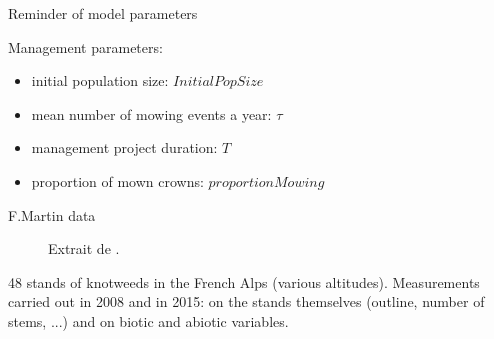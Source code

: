 \documentclass{myBeamer}
\begin{document}
\begin{frame}{Reminder of model parameters}
\bigbreak

Management parameters:
\begin{itemize}
\item initial population size: $ InitialPopSize $
\item mean number of mowing events a year: $\tau$
\item management project duration: $T$ 
\item proportion of mown crowns: $proportionMowing$
\end{itemize}

\end{frame}



\begin{frame}{F.Martin data}

\bigbreak 

\noindent
\begin{minipage}{0.45\linewidth}
\begin{figure}[H] 
\caption{Extrait de \cite{FMartin17}.}
\end{figure}
\end{minipage}
\begin{minipage}{0.45\linewidth}

48 stands of knotweeds in the French Alps (various altitudes). 
\smallbreak
Measurements carried out in 2008 and in 2015: on the stands themselves (outline, number of stems, ...) and on biotic and abiotic variables.


\end{minipage}
\end{frame}
\end{document}
